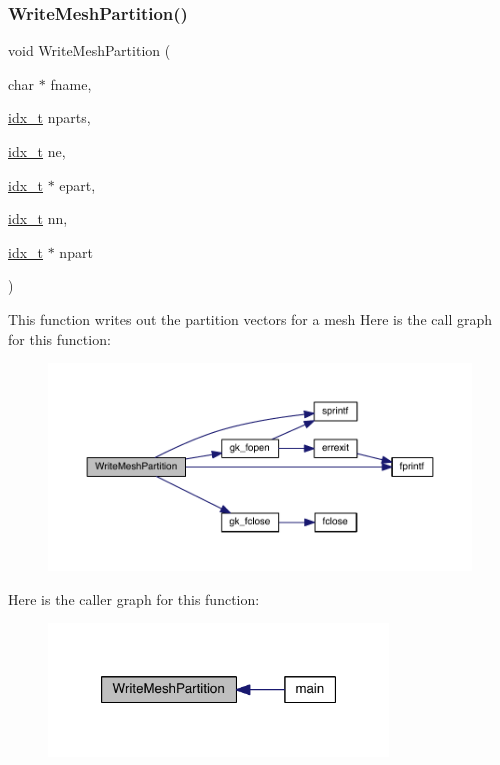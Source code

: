 \subsubsection{\texorpdfstring{Write\+Mesh\+Partition()}{WriteMeshPartition()}}
{\footnotesize\ttfamily void Write\+Mesh\+Partition (\begin{DoxyParamCaption}\item[{char $\ast$}]{fname,  }\item[{\hyperlink{a00876_aaa5262be3e700770163401acb0150f52}{idx\+\_\+t}}]{nparts,  }\item[{\hyperlink{a00876_aaa5262be3e700770163401acb0150f52}{idx\+\_\+t}}]{ne,  }\item[{\hyperlink{a00876_aaa5262be3e700770163401acb0150f52}{idx\+\_\+t} $\ast$}]{epart,  }\item[{\hyperlink{a00876_aaa5262be3e700770163401acb0150f52}{idx\+\_\+t}}]{nn,  }\item[{\hyperlink{a00876_aaa5262be3e700770163401acb0150f52}{idx\+\_\+t} $\ast$}]{npart }\end{DoxyParamCaption})}

This function writes out the partition vectors for a mesh Here is the call graph for this function\+:\nopagebreak
\begin{figure}[H]
\begin{center}
\leavevmode
\includegraphics[width=350pt]{a00858_a358cab47bd66ff23614f7f24996ba64c_cgraph}
\end{center}
\end{figure}
Here is the caller graph for this function\+:\nopagebreak
\begin{figure}[H]
\begin{center}
\leavevmode
\includegraphics[width=256pt]{a00858_a358cab47bd66ff23614f7f24996ba64c_icgraph}
\end{center}
\end{figure}
\mbox{\label{a00858_ab677f01037192ca57a5a167df7d350d3}} 
